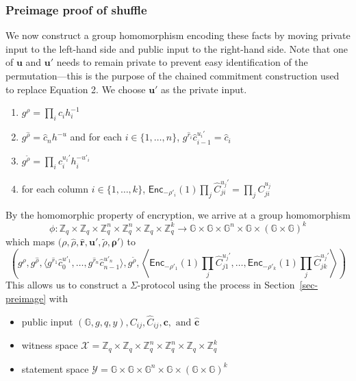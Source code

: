 \documentclass[12pt,a4paper]{article}
\theoremstyle{definition}
\begin{document}
\subsubsection{Preimage proof of shuffle}
We now construct a group homomorphism encoding these facts by moving private input to the left-hand side and public input to the right-hand side. Note that one of $\mathbf{u}$ and $\mathbf{u'}$ needs to remain private to prevent easy identification of the permutation---this is the purpose of the chained commitment construction used to replace Equation 2. We choose $\mathbf{u'}$ as the private input.
\begin{enumerate}
    \item $g^\rho=\prod_i c_i h_i^{-1}$
    \item $g^{\hat{\rho}}=\hat{c}_nh^{-u}$ and for each $i\in\{1,\ldots, n\}$, $g^{\hat{r}_i}\hat{c}_{i-1}^{u_i'}=\hat{c}_i$
    \item $g^{\tilde{\rho}} = \prod_i c_i^{u_i'}h_i^{-u'_i}$
    \item for each column $i\in\{1,\ldots, k\}$, $\mathsf{Enc}_{-\rho'_i}(1)\prod_j \hat{C}_{ji}^{u_j'}=\prod_j C^{u_j}_{ji}$
\end{enumerate}
By the homomorphic property of encryption, we arrive at a group homomorphism $$\phi:\mathbb{Z}_q\times\mathbb{Z}_q\times\mathbb{Z}_q^n\times\mathbb{Z}_q^n\times\mathbb{Z}_q\times\mathbb{Z}_q^k\rightarrow \mathbb{G}\times\mathbb{G}\times\mathbb{G}^n\times\mathbb{G}\times(\mathbb{G}\times\mathbb{G})^k$$
which maps $\big(\rho, \hat{\rho}, \mathbf{\hat{r}},\mathbf{u}', \tilde{\rho}, \mathbf{\rho}'\big)$ to
$$\left(g^\rho, g^{\hat{\rho}}, \langle g^{\hat{r}_1}\hat{c}_0^{u'_1},\ldots,g^{\hat{r}_n}\hat{c}_{n-1}^{u'_n}\rangle, g^{\tilde{\rho}},\left\langle
    \mathsf{Enc}_{-\rho'_1}(1)\prod_j \hat{C}_{j1}^{u_j'},
    \ldots,
    \mathsf{Enc}_{-\rho'_k}(1)\prod_j \hat{C}_{jk}^{u_j'}\right\rangle\right)$$
This allows us to construct a $\Sigma$-protocol using the process in Section~\ref{sec-preimage} with
\begin{itemize}
    \item public input $(\mathbb{G}, g, q, y), C_{ij}, \hat{C}_{ij}, \mathbf{c},\text{ and }\mathbf{\hat{c}}$
    \item witness space $\mathcal{X}=\mathbb{Z}_q\times\mathbb{Z}_q\times\mathbb{Z}_q^n\times\mathbb{Z}_q^n\times\mathbb{Z}_q\times\mathbb{Z}_q^k$
    \item statement space $\mathcal{Y} = \mathbb{G}\times\mathbb{G}\times\mathbb{G}^n\times\mathbb{G}\times(\mathbb{G}\times\mathbb{G})^k$
\end{itemize}
\end{document}
